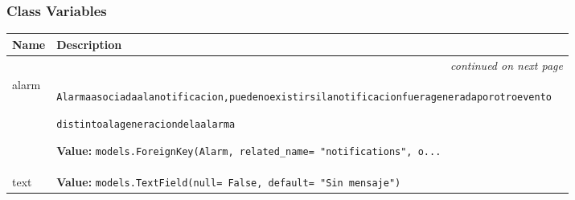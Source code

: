 
  \subsubsection{Class Variables}

    \vspace{-1cm}
\hspace{\varindent}\begin{longtable}{|p{\varnamewidth}|p{\vardescrwidth}|l}
\cline{1-2}
\cline{1-2} \centering \textbf{Name} & \centering \textbf{Description}& \\
\cline{1-2}
\endhead\cline{1-2}\multicolumn{3}{r}{\small\textit{continued on next page}}\\\endfoot\cline{1-2}
\endlastfoot\raggedright a\-l\-a\-r\-m\- & \raggedright \begin{alltt}

Alarma asociada a la notificacion, puede no existir si la notificacion fuera generada por otro evento

distinto a la generacion de la alarma
\end{alltt}

\textbf{Value:} 
{\tt models.ForeignKey(Alarm, related\_name= "notifications", o\texttt{...}}&\\
\cline{1-2}
\raggedright t\-e\-x\-t\- & \raggedright \textbf{Value:} 
{\tt models.TextField(null= False, default= "Sin mensaje")}&\\
\cline{1-2}
\end{longtable}


